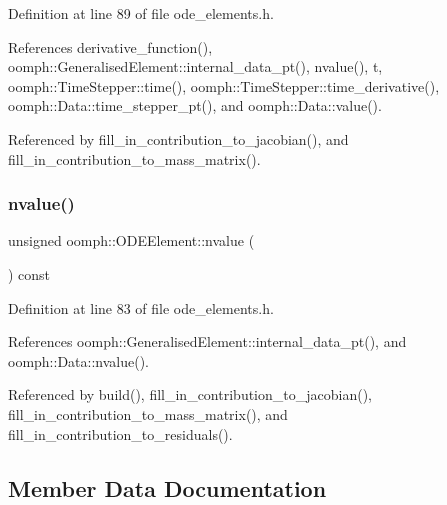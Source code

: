Definition at line 89 of file ode\+\_\+elements.\+h.



References derivative\+\_\+function(), oomph\+::\+Generalised\+Element\+::internal\+\_\+data\+\_\+pt(), nvalue(), t, oomph\+::\+Time\+Stepper\+::time(), oomph\+::\+Time\+Stepper\+::time\+\_\+derivative(), oomph\+::\+Data\+::time\+\_\+stepper\+\_\+pt(), and oomph\+::\+Data\+::value().



Referenced by fill\+\_\+in\+\_\+contribution\+\_\+to\+\_\+jacobian(), and fill\+\_\+in\+\_\+contribution\+\_\+to\+\_\+mass\+\_\+matrix().

\mbox{\label{classoomph_1_1ODEElement_ad968e4ce7f28115bf97f5854446bb5c4}} 
\subsubsection{\texorpdfstring{nvalue()}{nvalue()}}
{\footnotesize\ttfamily unsigned oomph\+::\+O\+D\+E\+Element\+::nvalue (\begin{DoxyParamCaption}{ }\end{DoxyParamCaption}) const\hspace{0.3cm}{\ttfamily [inline]}}



Definition at line 83 of file ode\+\_\+elements.\+h.



References oomph\+::\+Generalised\+Element\+::internal\+\_\+data\+\_\+pt(), and oomph\+::\+Data\+::nvalue().



Referenced by build(), fill\+\_\+in\+\_\+contribution\+\_\+to\+\_\+jacobian(), fill\+\_\+in\+\_\+contribution\+\_\+to\+\_\+mass\+\_\+matrix(), and fill\+\_\+in\+\_\+contribution\+\_\+to\+\_\+residuals().



\subsection{Member Data Documentation}
\mbox{\label{classoomph_1_1ODEElement_a57144f54edb040be5d139d2768fcd396}} 
